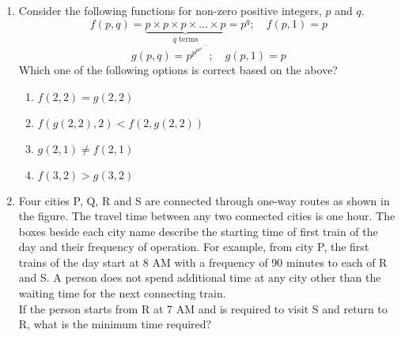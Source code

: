 \documentclass[journal]{IEEEtran}
\begin{document}
\begin{enumerate}
{    	
    	\begin{multicols}{4}
    		\begin{enumerate}
    			\item 18
    			\item 10 
    			\item 7
    			\item 5
    		\end{enumerate}
    	\end{multicols}
    
	}
    \item{
            Consider the following functions for non-zero positive integers, \(p\) and \(q\).
            \[
            f(p, q) = \underbrace{p \times p \times p \times \dots \times p}_{q \text{ terms}} = p^q; \quad f(p, 1) = p
            \]
            \[
            g(p, q) = p^{p^{p^{p^{p^{.^{.^{.^{\text{Upto q terms}}}}}}}}}; \quad g(p, 1) = p
            \]
            Which one of the following options is correct based on the above?
            
            
                
            \begin{multicols}{2}
                \begin{enumerate}
                	\item \(f(2,2) = g(2,2)\) \\
                	\item \(f(g(2,2), 2) < f(2, g(2,2))\) \\
                	\item \(g(2,1) \ne f(2,1)\) \\
                	\item \(f(3,2) > g(3,2)\)
                \end{enumerate}
            \end{multicols}

        
        }
    \item{
            Four cities P, Q, R and S are connected through one-way routes as shown in the
            figure. The travel time between any two connected cities is one hour. The boxes
            beside each city name describe the starting time of first train of the day and their
            frequency of operation. For example, from city P, the first trains of the day start
            at 8 AM with a frequency of 90 minutes to each of R and S. A person does not
            spend additional time at any city other than the waiting time for the next
            connecting train. \\ 
            If the person starts from R at 7 AM and is required to visit S and return to R,
            what is the minimum time required?
          \begin{center}
          	\begin{tikzpicture}
          		

\end{tikzpicture}
\end{center}}
\end{enumerate}
\end{document}
